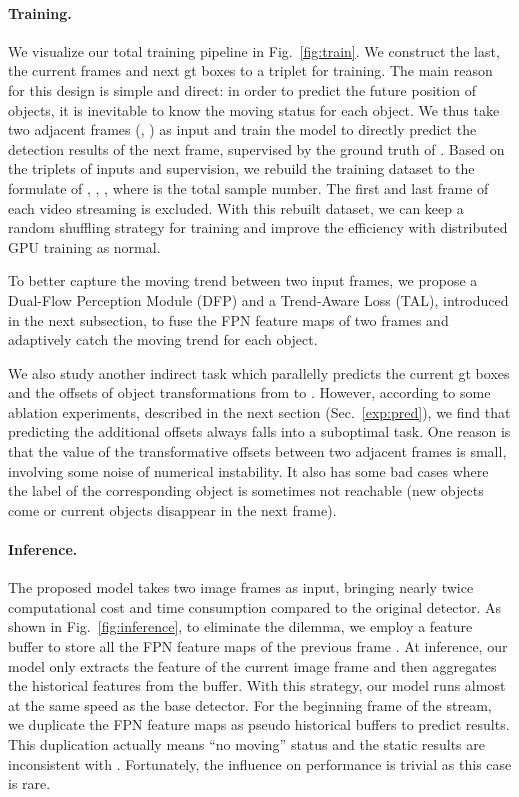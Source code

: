 \documentclass[10pt,twocolumn,letterpaper]{article}
\begin{document}
\paragraph{Training.} We visualize our total training pipeline in Fig.~\ref{fig:train}. We construct the last, the current frames and next gt boxes to a triplet  for training. The main reason for this design is simple and direct: in order to predict the future position of objects, it is inevitable to know the moving status for each object. We thus take two adjacent frames (, ) as input and train the model to directly predict the detection results of the next frame, supervised by the ground truth of . Based on the triplets of inputs and supervision, we rebuild the training dataset to the formulate of , , , where  is the total sample number. The first and last frame of each video streaming is excluded. With this rebuilt dataset, we can keep a random shuffling strategy for training and improve the efficiency with distributed GPU training as normal.



To better capture the moving trend between two input frames, we propose a Dual-Flow Perception Module (DFP) and a Trend-Aware Loss (TAL), introduced in the next subsection, to fuse the FPN feature maps of two frames and adaptively catch the moving trend for each object.

We also study another indirect task which parallelly predicts the current gt boxes  and the offsets of object transformations from  to . However, according to some ablation experiments, described in the next section (Sec.~\ref{exp:pred}), we find that predicting the additional offsets always falls into a suboptimal task. One reason is that the value of the transformative offsets between two adjacent frames is small, involving some noise of numerical instability. It also has some bad cases where the label of the corresponding object is sometimes not reachable (new objects come or current objects disappear in the next frame).   

\paragraph{Inference.} The proposed model takes two image frames as input, bringing nearly twice computational cost and time consumption compared to the original detector. As shown in Fig.~\ref{fig:inference}, to eliminate the dilemma, we employ a feature buffer to store all the FPN feature maps of the previous frame . At inference, our model only extracts the feature of the current image frame and then aggregates the historical features from the buffer. With this strategy, our model runs almost at the same speed as the base detector. For the beginning frame  of the stream, we duplicate the FPN feature maps as pseudo historical buffers to predict results. This duplication actually means ``no moving'' status and the static results are inconsistent with . Fortunately, the influence on performance is trivial as this case is rare.   
\end{document}
